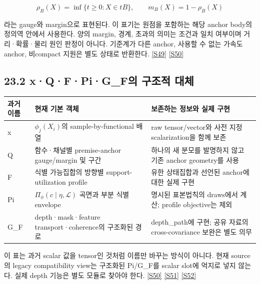 \documentclass[11pt,a4paper]{article}
\begin{document}
\[
\rho_B(X)=\inf\{t\ge0:X\in tB\},
\qquad m_B(X)=1-\rho_B(X)
\]

라는 gauge와 margin으로 표현된다. 이 표기는 원점을 포함하는 해당 anchor body의 정의역 안에서 사용한다. 양의 margin, 경계, 초과의 의미는 조건과 일치 여부이며 거리·확률·물리 원인 판정이 아니다. 기준계가 다른 anchor, 사용할 수 없는 가속도 anchor, 비compact 지원은 별도 상태로 반환한다. \hyperlink{src:S49}{[S49]} \hyperlink{src:S50}{[S50]}


\subsection*{23.2 x·Q·F·Pi·G\_F의 구조적 대체}

{\small\setlength{\tabcolsep}{4pt}\renewcommand{\arraystretch}{1.3}

\begin{longtable}{>{\raggedright\arraybackslash}p{0.2300\dimexpr\linewidth-24pt\relax}>{\raggedright\arraybackslash}p{0.2900\dimexpr\linewidth-24pt\relax}>{\raggedright\arraybackslash}p{0.4800\dimexpr\linewidth-24pt\relax}}\toprule

과거 이름 & 현재 기본 객체 & 보존하는 정보와 실제 구현 \\

\midrule\endhead

x & \(\phi_j(X_i)\)의 sample-by-functional 배열 & raw tensor/vector와 사전 지정 scalarization을 함께 보존 \\

Q & 함수·채널별 premise-anchor gauge/margin 및 구간 & 하나의 새 분모를 발명하지 않고 기존 anchor geometry를 사용 \\

F & 식별 가능집합의 방향별 support-utilization profile & 유한 상태집합과 선언된 anchor에 대한 실제 구현 \\

Pi & \(\Pi_\phi(c\mid\eta,\mathcal L)\) 곡면과 부분 식별 envelope & 명시된 표본법칙의 draws에서 계산; profile objective는 제외 \\

G\_F & depth·mask·feature transport·coherence의 구조화된 경로 & depth\_path에 구현; 공유 자료의 cross-covariance 보완은 별도 의무 \\

\bottomrule\end{longtable}}

이 표는 과거 scalar 값을 tensor인 것처럼 이름만 바꾸는 방식이 아니다. 현재 source의 legacy compatibility view는 구조화된 Pi/G\_F를 scalar slot에 억지로 넣지 않는다. 실제 depth 기능은 별도 모듈로 찾아야 한다. \hyperlink{src:S50}{[S50]} \hyperlink{src:S51}{[S51]} \hyperlink{src:S52}{[S52]}
\end{document}
